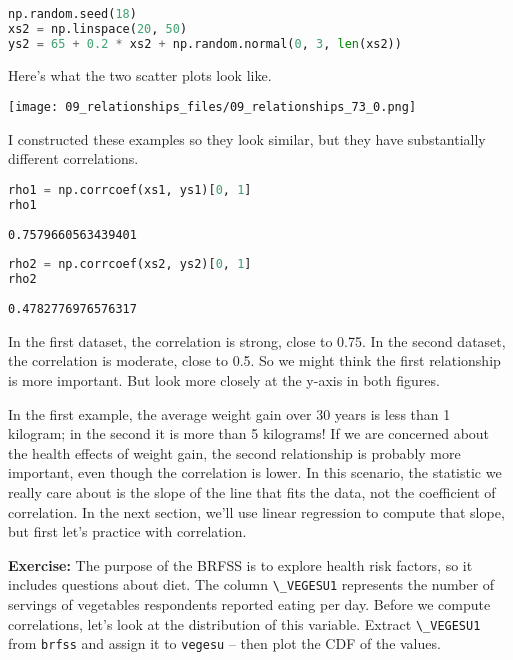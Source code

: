 \begin{lstlisting}[language=Python,style=source]
np.random.seed(18)
xs2 = np.linspace(20, 50)
ys2 = 65 + 0.2 * xs2 + np.random.normal(0, 3, len(xs2))
\end{lstlisting}

Here's what the two scatter plots look like.



\begin{center}
\texttt{[image: 09\_relationships\_files/09\_relationships\_73\_0.png]}
\end{center}

I constructed these examples so they look similar, but they have
substantially different correlations.

\begin{lstlisting}[language=Python,style=source]
rho1 = np.corrcoef(xs1, ys1)[0, 1]
rho1
\end{lstlisting}

\begin{lstlisting}[style=output]
0.7579660563439401
\end{lstlisting}

\begin{lstlisting}[language=Python,style=source]
rho2 = np.corrcoef(xs2, ys2)[0, 1]
rho2
\end{lstlisting}

\begin{lstlisting}[style=output]
0.4782776976576317
\end{lstlisting}

In the first dataset, the correlation is strong, close to 0.75. In the
second dataset, the correlation is moderate, close to 0.5. So we might
think the first relationship is more important. But look more closely at
the y-axis in both figures.

In the first example, the average weight gain over 30 years is less than
1 kilogram; in the second it is more than 5 kilograms! If we are
concerned about the health effects of weight gain, the second
relationship is probably more important, even though the correlation is
lower. In this scenario, the statistic we really care about is the slope
of the line that fits the data, not the coefficient of correlation. In
the next section, we'll use linear regression to compute that slope, but
first let's practice with correlation.

\textbf{Exercise:} The purpose of the BRFSS is to explore health risk
factors, so it includes questions about diet. The column
\passthrough{\lstinline!\_VEGESU1!} represents the number of servings of
vegetables respondents reported eating per day. Before we compute
correlations, let's look at the distribution of this variable. Extract
\passthrough{\lstinline!\_VEGESU1!} from \passthrough{\lstinline!brfss!}
and assign it to \passthrough{\lstinline!vegesu!} -- then plot the CDF
of the values.

